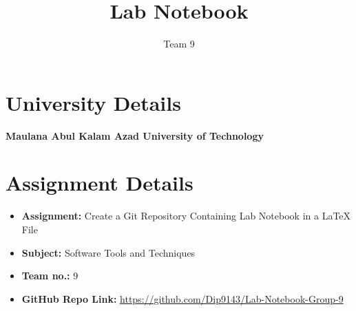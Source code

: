 \documentclass[a4paper,12pt]{article}
\title{Lab Notebook}
\author{Team 9}
\date{}
\begin{document}
\maketitle

\section*{University Details}
\textbf{Maulana Abul Kalam Azad University of Technology}

\section*{Assignment Details}
\begin{itemize}
    \item \textbf{Assignment:} Create a Git Repository Containing Lab Notebook in a LaTeX File
    \item \textbf{Subject:} Software Tools and Techniques
    \item \textbf{Team no.:} 9
    \item \textbf{GitHub Repo Link:} \url{https://github.com/Dip9143/Lab-Notebook-Group-9}
\end{itemize}
\end{document}
